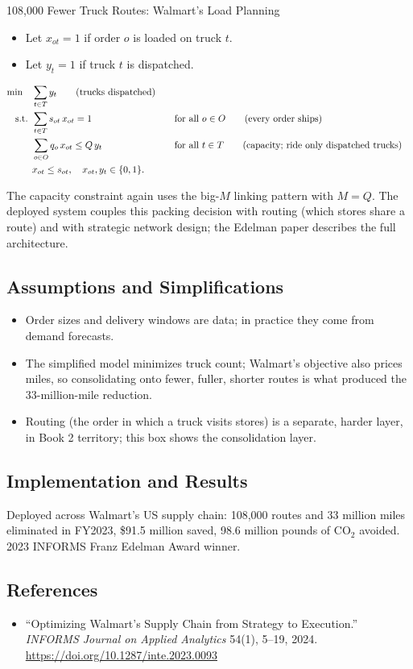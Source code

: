 \begin{casestudybox}{108{,}000 Fewer Truck Routes: Walmart's Load Planning}
\begin{itemize}
\item Let $x_{ot} = 1$ if order $o$ is loaded on truck $t$.
\item Let $y_t = 1$ if truck $t$ is dispatched.
\end{itemize}

\begin{align*}
\min \quad & \sum_{t \in T} y_t   \tag{trucks dispatched} \\
\mbox{ s.t. }        & \sum_{t \in T} s_{ot}\, x_{ot} = 1 &&\quad \mbox{for all } o \in O   \tag{every order ships} \\
           & \sum_{o \in O} q_o\, x_{ot} \leq Q\, y_t &&\quad \mbox{for all } t \in T   \tag{capacity; ride only dispatched trucks} \\
           & x_{ot} \leq s_{ot}, \quad x_{ot}, y_t \in \{0,1\}.
\end{align*}

The capacity constraint again uses the big-$M$ linking pattern with $M = Q$.  The deployed system couples this packing decision with routing (which stores share a route) and with strategic network design; the Edelman paper describes the full architecture.

\subsection*{Assumptions and Simplifications}
\begin{itemize}
\item Order sizes and delivery windows are data; in practice they come from demand forecasts.
\item The simplified model minimizes truck count; Walmart's objective also prices miles, so consolidating onto fewer, fuller, shorter routes is what produced the 33-million-mile reduction.
\item Routing (the order in which a truck visits stores) is a separate, harder layer, in Book 2 territory; this box shows the consolidation layer.
\end{itemize}

\subsection*{Implementation and Results}
Deployed across Walmart's US supply chain: 108{,}000 routes and 33 million miles eliminated in FY2023, \$91.5 million saved, 98.6 million pounds of CO$_2$ avoided.  2023 INFORMS Franz Edelman Award winner.

\subsection*{References}
\begin{itemize}
\item ``Optimizing Walmart's Supply Chain from Strategy to Execution.'' \emph{INFORMS Journal on Applied Analytics} 54(1), 5--19, 2024. \url{https://doi.org/10.1287/inte.2023.0093}
\end{itemize}
\end{casestudybox}

